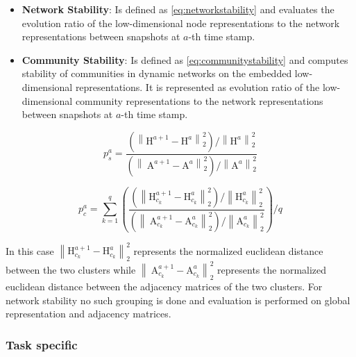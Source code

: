 \documentclass[
acmsmall,
nonacm,
screen,
acmthm]{acmart}
\providecommand{\tightlist}{%
\setlength{\itemsep}{0pt}\setlength{\parskip}{0pt}}
\begin{document}
\begin{itemize}
\tightlist
\item
  \textbf{Network Stability}: Is defined as \cref{eq:networkstability}
  and evaluates the evolution ratio of the low-dimensional node
  representations to the network representations between snapshots at
  \(a\)-th time stamp.
\item
  \textbf{Community Stability}: Is defined as
  \cref{eq:communitystability} and computes stability of communities in
  dynamic networks on the embedded low-dimensional representations. It
  is represented as evolution ratio of the low-dimensional community
  representations to the network representations between snapshots at
  \(a\)-th time stamp.
\end{itemize}

\begin{equation}
p_{s}^{a}=\frac{\left(\left\|\mathrm{H}^{a+1}-\mathrm{H}^{a}\right\|_{2}^{2}\right) /\left\|\mathrm{H}^{a}\right\|_{2}^{2}}{\left(\left\|\mathrm{~A}^{a+1}-\mathrm{A}^{a}\right\|_{2}^{2}\right) /\left\|\mathrm{A}^{a}\right\|_{2}^{2}}
\label{eq:networkstability}\end{equation}

\begin{equation}
p_{c}^{a}=\sum_{k=1}^{q}\left(\frac{\left(\left\|\mathrm{H}_{c_{k}}^{a+1}-\mathrm{H}_{c_{k}}^{a}\right\|_{2}^{2}\right) /\left\|\mathrm{H}_{c_{k}}^{a}\right\|_{2}^{2}}{\left(\left\|\mathrm{~A}_{c_{k}}^{a+1}-\mathrm{A}_{c_{k}}^{a}\right\|_{2}^{2}\right) /\left\|\mathrm{A}_{c_{k}}^{a}\right\|_{2}^{2}}\right) / q
\label{eq:communitystability}\end{equation}

In this case
\(\left\|\mathrm{H}_{c_{k}}^{a+1}-\mathrm{H}_{c_{k}}^{a}\right\|_{2}^{2}\)
represents the normalized euclidean distance between the two clusters
while
\(\left\|\mathrm{~A}_{c_{k}}^{a+1}-\mathrm{A}_{c_{k}}^{a}\right\|_{2}^{2}\)
represents the normalized euclidean distance between the adjacency
matrices of the two clusters. For network stability no such grouping is
done and evaluation is performed on global representation and adjacency
matrices.

\hypertarget{task-specific}{%
\subsubsection{Task specific}\label{task-specific}}
\end{document}
